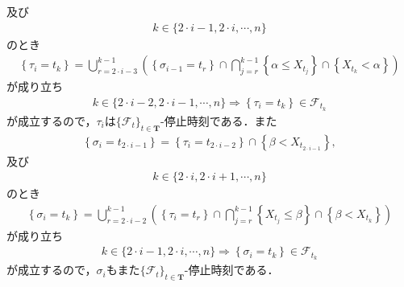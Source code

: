 	及び
	\begin{align}
		k \in \{2 \cdot i - 1,2 \cdot i,\cdots,n\}
	\end{align}
	のとき
	\begin{align}
		\left\{\tau_i = t_k\right\} = 
		\bigcup_{r=2 \cdot i-3}^{k-1}\left( \left\{\sigma_{i-1}=t_r\right\} \cap \bigcap_{j=r}^{k-1} \left\{\alpha \leq X_{t_j}\right\} \cap \left\{X_{t_k} < \alpha\right\} \right)
	\end{align}
	が成り立ち
	\begin{align}
		k \in \{2 \cdot i-2,2 \cdot i-1,\cdots,n\} \Longrightarrow \left\{\tau_i = t_k\right\} \in \mathscr{F}_{t_k}
 	\end{align}
 	が成立するので，$\tau_i$は$\{\mathscr{F}_t\}_{t \in \mathbf{T}}$-停止時刻である．また
 	\begin{align}
		\left\{\sigma_i = t_{2 \cdot i-1}\right\} = \left\{\tau_i = t_{2 \cdot i-2}\right\} \cap \left\{\beta < X_{t_{2 \cdot i-1}}\right\},
	\end{align}
	及び
	\begin{align}
		k \in \{2 \cdot i,2 \cdot i+1,\cdots,n\}
	\end{align}
	のとき
	\begin{align}
		\left\{\sigma_i = t_k\right\} = 
		\bigcup_{r=2 \cdot i-2}^{k-1}\left( \left\{\tau_i=t_r\right\} \cap \bigcap_{j=r}^{k-1} \left\{X_{t_j} \leq \beta\right\} \cap \left\{\beta < X_{t_k}\right\} \right)
	\end{align}
	が成り立ち
	\begin{align}
		k \in \{2 \cdot i - 1,2 \cdot i,\cdots,n\} \Longrightarrow \left\{\sigma_i = t_k\right\} \in \mathscr{F}_{t_k}
 	\end{align}
 	が成立するので，$\sigma_i$もまた$\{\mathscr{F}_t\}_{t \in \mathbf{T}}$-停止時刻である．